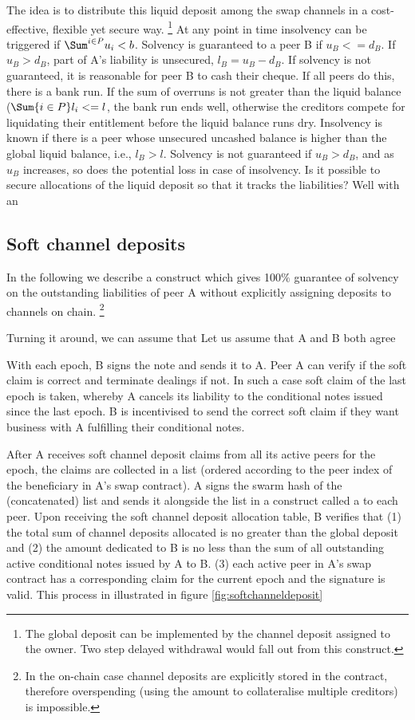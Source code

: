 The idea is to distribute this liquid deposit among the swap channels in a cost-effective, flexible yet secure way.%
%
\footnote{The global deposit can be implemented by the channel deposit assigned to the owner. Two step delayed withdrawal would fall out from this construct.}
%
At any point in time insolvency can be triggered if $\Sum^{i\in P}u_i < b$. Solvency is guaranteed to a peer B if 
$u_B <= d_B$. If $u_B > d_B$, part of A's liability is unsecured, $l_B = u_B - d_B$. If solvency is not guaranteed, it is reasonable for peer B to cash their cheque. If all peers do this, there is a bank run. If the sum of overruns is not greater than the liquid balance ($\Sum{i\in P}l_i <= l$, the bank run ends well, otherwise the creditors compete for 
liquidating their entitlement before the liquid balance runs dry. 
Insolvency is known if there is a peer whose unsecured uncashed balance is higher than the global liquid balance, i.e., $l_B > l$.
Solvency is not guaranteed if $u_B > d_B$, and as $u_B$ increases, so does the potential loss in case of insolvency. Is it possible to secure allocations of the liquid deposit so that it tracks the liabilities? Well with an 

\subsection{Soft channel deposits}

In the following we describe a construct which gives 100$\%$ guarantee of solvency on the outstanding liabilities of peer A without explicitly assigning deposits to channels on chain.%
%
\footnote{In the on-chain case channel deposits are explicitly stored in the contract, therefore overspending
(using the amount to collateralise multiple creditors) is impossible.}

Turning it around, we can assume that 
Let us assume that A and B both agree 

With each epoch, B signs the note and sends it to A.
Peer A can verify if the soft claim is correct and terminate dealings if not. In such a case soft claim of
the last epoch is taken, whereby A cancels its liability to the conditional notes issued since
the last epoch.
B is incentivised to send the correct soft claim if they want business with A fulfilling their
conditional notes.

After A receives soft channel deposit claims from all its active peers for the epoch, the claims are
collected in a list (ordered according to the peer index of the beneficiary in A's swap contract).
A signs the swarm hash of the (concatenated) list and sends it alongside the list
in a construct called a  to each peer.
Upon receiving the soft channel deposit allocation table, B verifies that
(1) the total sum of channel deposits allocated is no greater than the global deposit and
(2) the amount dedicated to B is no less than the sum of all outstanding active
conditional notes issued by A to B.
(3) each active peer in A's swap contract has a corresponding claim for the current epoch and the signature is valid.
This process in illustrated in figure \ref{fig:softchanneldeposit}


